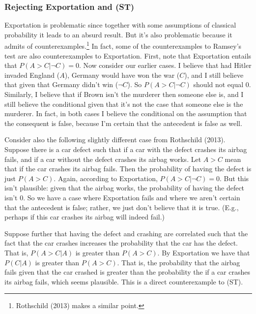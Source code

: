 \documentclass[12pt]{article}
\begin{document}
\subsubsection{Rejecting Exportation and (ST)}

Exportation is problematic since together with some assumptions of classical probability it leads to an absurd result. But it's also problematic because it admits of counterexamples.\footnote{Rothschild (2013) makes a similar point.} In fact, some of the counterexamples to Ramsey's test are also counterexamples to Exportation. First, note that Exportation entails that $P(A>C|\neg C)=0$. Now consider our earlier cases. I believe that had Hitler invaded England ($A$), Germany would have won the war ($C$), and I still believe that given that Germany didn't win ($\neg C$). So $P(A>C|\neg C)$ should not equal $0$. Similarly, I believe that if Brown isn't the murderer then someone else is, and I still believe the conditional given that it's not the case that someone else is the murderer. In fact, in both cases I believe the conditional on the assumption that the consequent is false, because I'm certain that the antecedent is false as well.

Consider also the following slightly different case from Rothschild (2013). Suppose there is a car defect such that if a car with the defect crashes its airbag fails, and if a car without the defect crashes its airbag works. Let $A>C$ mean that if the car crashes its airbag fails. Then the probability of having the defect is just $P(A>C)$. Again, according to Exportation, $P(A>C|\neg C)=0$. But this isn't plausible: given that the airbag works, the probability of having the defect isn't 0. So we have a case where Exportation fails and where we aren't certain that the antecedent is false; rather, we just don't believe that it is true. (E.g., perhaps if this car crashes its airbag will indeed fail.)

Suppose further that having the defect and crashing are correlated such that the fact that the car crashes increases the probability that the car has the defect. That is, $P(A>C|A)$ is greater than $P(A>C)$. By Exportation we have that $P(C|A)$ is greater than $P(A>C)$. That is, the probability that the airbag fails given that the car crashed is greater than the probability the if a car crashes its airbag fails, which seems plausible. This is a direct counterexample to (ST). 
\end{document}
